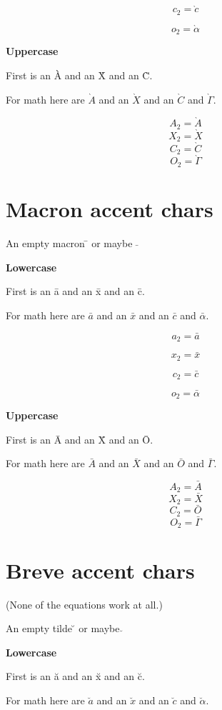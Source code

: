 \documentclass{article}
\begin{document}
$$c_2=\grave{c}$$

$$o_2=\grave{\alpha}$$

\textbf{Uppercase}

First is an \`{A} and an \`{X} and an \`{C}.

For math here are $\grave{A}$ and an $\grave{X}$ and an $\grave{C}$ and $\grave{\Gamma}$.

$$A_2=\grave{A}$$
$$X_2=\grave{X}$$
$$C_2=\grave{C}$$
$$O_2=\grave{\Gamma}$$




\section{Macron accent chars}

An empty macron \={} or maybe $\bar{}$

\textbf{Lowercase}

First is an \={a} and an \={x} and an \={c}.

For math here are $\bar{a}$ and an $\bar{x}$ and an $\bar{c}$ and $\bar{\alpha}$.

$$a_2=\bar{a}$$

$$x_2=\bar{x}$$

$$c_2=\bar{c}$$

$$o_2=\bar{\alpha}$$

\textbf{Uppercase}

First is an \={A} and an \={X} and an \={O}.

For math here are $\bar{A}$ and an $\bar{X}$ and an $\bar{O}$ and $\bar{\Gamma}$.

$$A_2=\bar{A}$$
$$X_2=\bar{X}$$
$$C_2=\bar{O}$$
$$O_2=\bar{\Gamma}$$




\section{Breve accent chars}

(None of the equations work at all.)

An empty tilde \u{} or maybe $\breve{}$

\textbf{Lowercase}

First is an \u{a} and an \u{x} and an \u{c}.

For math here are $\breve{a}$ and an $\breve{x}$ and an $\breve{c}$ and $\breve{\alpha}$.
\end{document}
